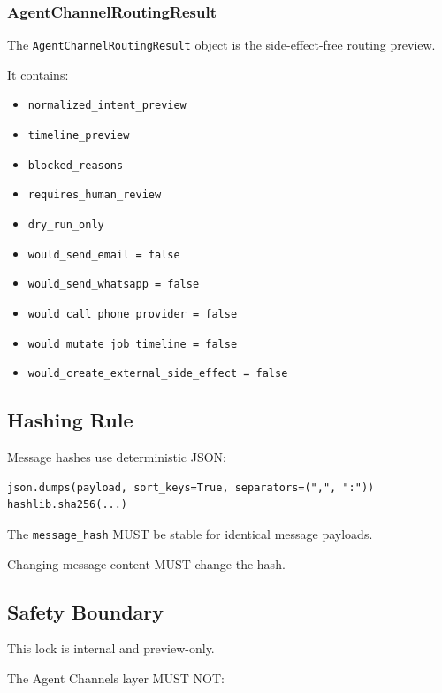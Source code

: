 \subsubsection{AgentChannelRoutingResult}

The \texttt{AgentChannelRoutingResult} object is the side-effect-free routing preview.

It contains:

\begin{itemize}
  \item \texttt{normalized\_intent\_preview}
  \item \texttt{timeline\_preview}
  \item \texttt{blocked\_reasons}
  \item \texttt{requires\_human\_review}
  \item \texttt{dry\_run\_only}
  \item \texttt{would\_send\_email = false}
  \item \texttt{would\_send\_whatsapp = false}
  \item \texttt{would\_call\_phone\_provider = false}
  \item \texttt{would\_mutate\_job\_timeline = false}
  \item \texttt{would\_create\_external\_side\_effect = false}
\end{itemize}

\subsection{Hashing Rule}

Message hashes use deterministic JSON:

\begin{verbatim}
json.dumps(payload, sort_keys=True, separators=(",", ":"))
hashlib.sha256(...)
\end{verbatim}

The \texttt{message\_hash} MUST be stable for identical message payloads.

Changing message content MUST change the hash.

\subsection{Safety Boundary}

This lock is internal and preview-only.

The Agent Channels layer MUST NOT:

